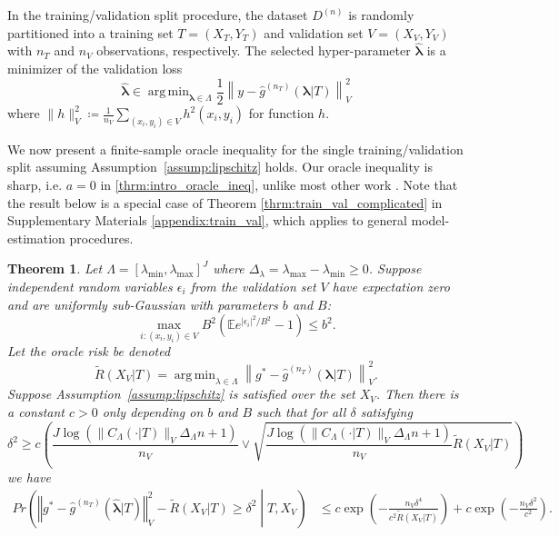\documentclass[12pt]{article} %
\newtheorem{theorem}{Theorem}
\theoremstyle{definition}
\DeclareMathOperator*{\argmin}{arg\,min}
\begin{document}
In the training/validation split procedure, the dataset $D^{(n)}$ is randomly partitioned into a training set $T = (X_T, Y_T)$ and validation set $V = (X_V, Y_V)$ with $n_T$ and $n_V$ observations, respectively.
The selected hyper-parameter $\hat{\boldsymbol{\lambda}}$ is a minimizer of the validation loss
\begin{equation}
\label{eq:train_val_lambda}
\hat{\boldsymbol \lambda} \in \argmin_{\boldsymbol{\lambda} \in\Lambda} \frac{1}{2} \left \| y-\hat{g}^{(n_T)}( \boldsymbol \lambda | T) \right \|_{V}^{2}
\end{equation}
where $\| h \|^2_{V} \coloneqq \frac{1}{n_V}\sum_{(x_i, y_i)\in V} h^2(x_i, y_i)$ for function $h$.

We now present a finite-sample oracle inequality for the single training/validation split assuming Assumption~\ref{assump:lipschitz} holds.
Our oracle inequality is sharp, i.e. $a=0$ in \eqref{thrm:intro_oracle_ineq}, unlike most other work \citep{gyorfi2006distribution, lecue2012oracle, van2003unified}.
Note that the result below is a special case of Theorem \ref{thrm:train_val_complicated} in Supplementary Materials \ref{appendix:train_val}, which applies to general model-estimation procedures.
\begin{theorem}
	\label{thrm:train_val}
	Let $\Lambda=[\lambda_{\min},\lambda_{\max}]^{J}$ where $\Delta_{\lambda} = \lambda_{\max} - \lambda_{\min} \ge 0$.
	Suppose independent random variables $\epsilon_i$ from the validation set $V$ have expectation zero and are uniformly sub-Gaussian with parameters $b$ and $B$:
	$$
	\max_{i: (x_i, y_i) \in V} B^2 \left ( \mathbb{E} e^{|\epsilon_i|^2/B^2} - 1 \right ) \le b^2.
	$$
	Let the oracle risk be denoted
	\begin{equation}
	\tilde{R}(X_V|T) = \argmin_{\lambda \in \Lambda} \left \| g^*-\hat{g}^{(n_T)}( \boldsymbol{\lambda} | T) \right \|_{V}^{2}.
	\label{eq:tilde_lambda_def}
	\end{equation}
	Suppose Assumption~\ref{assump:lipschitz} is satisfied over the set $X_V$.
	Then there is a constant $c>0$ only depending on $b$ and $B$ such that for all $\delta$ satisfying
	\begin{equation}
	\delta^{2}
	\ge
	c \left (
	\frac{J \log(\|C_\Lambda(\cdot |T)\|_V \Delta_{\Lambda} n + 1)}{n_{V}}
	\vee 
	\sqrt{\frac{J \log(\|C_\Lambda(\cdot |T)\|_V \Delta_{\Lambda} n + 1)}{n_{V}}
		\tilde{R}(X_V|T)}
	\right )
	\label{thrm:train_val_delta}
	\end{equation}
	we have
	\begin{align}
	Pr\left(
	\left\Vert g^* - \hat{g}^{(n_T)}( \hat{\boldsymbol{\lambda}} | T) \right\Vert _{V}^2 -
	\tilde{R}(X_V|T)
	\ge\delta^2
	\middle | 
	T, X_V
	\right )
	&\le c\exp\left(-\frac{n_{V}\delta^{4}}{c^{2} \tilde{R}(X_V|T)}\right)
	+ c\exp\left(-\frac{n_{V}\delta^{2}}{c^{2}}\right).
	\end{align}
	
\end{theorem}
\end{document}
